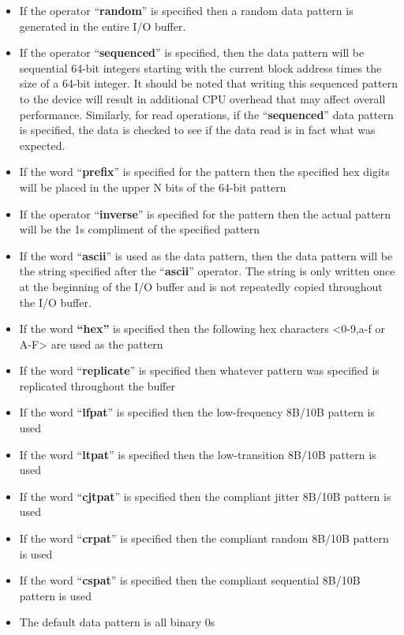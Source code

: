 \begin{itemize}
\item
  If the operator ``\textbf{random}'' is specified then a random data pattern is generated in the entire I/O buffer.
\item
  If the operator ``\textbf{sequenced}'' is specified, then the data pattern will be sequential 64-bit integers starting with the current block address times the size of a 64-bit integer. It should be noted that writing this sequenced pattern to the device will result in additional CPU overhead that may affect overall performance. Similarly, for read operations, if the ``\textbf{sequenced}'' data pattern is specified, the data is checked to see if the data read is in fact what was expected.
\item
  If the word ``\textbf{prefix}'' is specified for the pattern then the specified hex digits will be placed in the upper N bits of the 64-bit pattern
\item
  If the operator ``\textbf{inverse}'' is specified for the pattern then the actual pattern will be the 1\textquotesingle s compliment of the specified pattern
\item
  If the word ``\textbf{ascii}'' is used as the data pattern, then the data pattern will be the string specified after the ``\textbf{ascii}'' operator. The string is only written once at the beginning of the I/O buffer and is not repeatedly copied throughout the I/O buffer.
\item
  If the word \textbf{``hex''} is specified then the following hex characters \textless0-9,a-f or A-F\textgreater{} are used as the pattern
\item
  If the word ``\textbf{replicate}'' is specified then whatever pattern was specified is replicated throughout the buffer
\item
  If the word ``\textbf{lfpat}'' is specified then the low-frequency 8B/10B pattern is used
\item
  If the word ``\textbf{ltpat}'' is specified then the low-transition 8B/10B pattern is used
\item
  If the word ``\textbf{cjtpat}'' is specified then the compliant jitter 8B/10B pattern is used
\item
  If the word ``\textbf{crpat}'' is specified then the compliant random 8B/10B pattern is used
\item
  If the word ``\textbf{cspat}'' is specified then the compliant sequential 8B/10B pattern is used
\item
  The default data pattern is all binary 0\textquotesingle s
\end{itemize}

